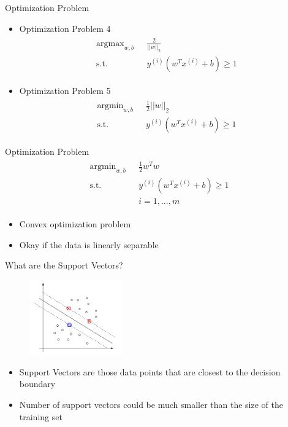 \documentclass{beamer}
\begin{document}
\begin{frame}{Optimization Problem}
\begin{itemize}
\item  Optimization Problem 4
\begin{align}
\begin{split}
\text{argmax}_{w, b}\text{   }&\frac{2}{||w||_2} \\
\text{s.t.} \text{   }&y^{(i)}\left(w^Tx^{(i)} + b\right) \geq 1
\end{split}
\end{align}
\item  Optimization Problem 5
\begin{align}
\begin{split}
\text{argmin}_{w, b}\text{   }&\frac{1}{2}||w||_2 \\
\text{s.t.} \text{   }&y^{(i)}\left(w^Tx^{(i)} + b\right) \geq 1
\end{split}
\end{align}
\end{itemize}
\end{frame}

\begin{frame}{Optimization Problem}
\begin{align}
\begin{split}
\text{argmin}_{w, b}\text{   }&\frac{1}{2}w^Tw \\
\text{s.t.} \text{   }&y^{(i)}\left(w^Tx^{(i)} + b\right) \geq 1\\
&i = 1,...,m
\end{split}
\end{align}
\begin{itemize}
\item Convex optimization problem
\item Okay if the data is linearly separable
\end{itemize}
\end{frame}

\begin{frame}{What are the Support Vectors?}
\begin{figure}
\includegraphics[width=4cm]{images/img5.png}
\end{figure}
\begin{itemize}
\item Support Vectors are those data points that are closest to the decision boundary
\item Number of support vectors could be much smaller than the size of the training set
\end{itemize}
\end{frame}
\end{document}
